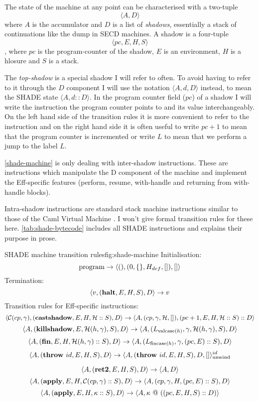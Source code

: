\documentclass[class=article, crop=false]{standalone}
\begin{document}
The state of the machine at any point can be characterised with a two-tuple
$$ \langle A, D \rangle $$
where $A$ is the accumulator and $D$ is a list of \emph{shadows}, essentially a stack
of continuations like the dump in SECD machines.
A shadow is a four-tuple $$ \langle pc, E, H, S \rangle $$, where $pc$ is the
program-counter of the shadow, $E$ is an environment, $H$ is a hlosure and $S$ is
a stack.

The \emph{top-shadow} is a special shadow I will refer to often. To avoid having to refer to
it through the $D$ component I will use the notation $\langle A, d, D \rangle$ instead, to mean the SHADE state
 $\langle A, d :: D \rangle$.
In the program counter field ($pc$) of a shadow I will write the instruction the program counter
points to and its value interchangeably. On the left hand side of the transition rules it is more
convenient to refer to the instruction and on the right hand side it is often useful to write
$pc+1$ to mean that the program counter is incremented or write $L$ to mean
that we perform a jump to the label $L$.

\autoref{shade-machine} is only dealing with inter-shadow instructions. These are instructions which manipulate
the D component of the machine and implement the Eff-specific features (perform, resume, with-handle and
returning from with-handle blocks).

Intra-shadow instructions are standard stack machine instructions similar to those of the Caml Virtual Machine \cite{caml-vm}.
I won't give formal transition rules for these here. \autoref{tab:shade-bytecode} includes all SHADE instructions and explains their purpose in prose.

\begin{myfigure}[0.95]{SHADE machine transition rules}{fig:shade-machine}
    Initialisation:
    $$\text{program} \to \langle \mathbf{()}, (0, \{\}, H_{def}, []), [] \rangle$$
    Termination:
    $$ \langle v, (\mathbf{halt}, E, H, S), D \rangle \to v $$
    Transition rules for Eff-specific instructions:
    $$ \langle \mathcal{C}(cp, \gamma), (\mathbf{castshadow}, E, H, \mathcal{H} :: S), D \rangle \to \langle A, (cp, \gamma, \mathcal{H}, []), (pc+1, E, H, \mathcal{H} :: S) :: D \rangle $$
    $$ \langle A, (\mathbf{killshadow}, E, \mathcal{H}(h, \gamma), S), D \rangle \to  \langle A, (L_{\text{valcase}(h)}, \gamma, \mathcal{H}(h, \gamma),S), D \rangle $$
    $$ \langle A, (\mathbf{fin}, E, H, \mathcal{H}(h, \gamma) :: S), D \rangle \to \langle A, (L_{\text{fincase}(h)}, \gamma, (pc, E) :: S), D \rangle $$
    $$ \langle A, (\mathbf{throw}\ id, E, H, S), D \rangle \to \langle A, (\mathbf{throw}\ id, E, H, S), D, [] \rangle_\text{unwind}^{id} $$

    $$ \langle A, (\mathbf{ret2}, E, H, S), D \rangle \to \langle A, D \rangle $$
    $$ \langle A, (\mathbf{apply}, E, H, \mathcal{C}(cp, \gamma) :: S), D \rangle \to \langle A, (cp, \gamma, H, (pc, E) :: S), D \rangle $$
    $$ \langle A, (\mathbf{apply}, E, H, \kappa :: S), D \rangle \to \langle A, \kappa\ @\ ((pc, E, H, S) :: D) \rangle $$
\end{myfigure}
\end{document}

